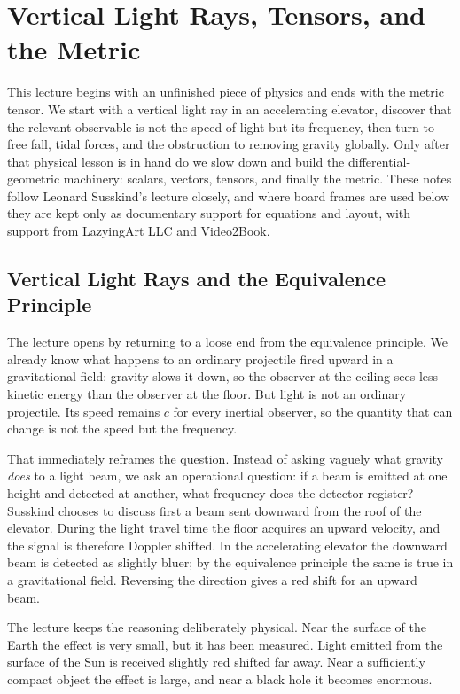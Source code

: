 \chapter{Vertical Light Rays, Tensors, and the Metric}

This lecture begins with an unfinished piece of physics and ends with the metric tensor. We start with a vertical light ray in an accelerating elevator, discover that the relevant observable is not the speed of light but its frequency, then turn to free fall, tidal forces, and the obstruction to removing gravity globally. Only after that physical lesson is in hand do we slow down and build the differential-geometric machinery: scalars, vectors, tensors, and finally the metric. These notes follow Leonard Susskind's lecture closely, and where board frames are used below they are kept only as documentary support for equations and layout, with support from LazyingArt LLC and Video2Book.

\section{Vertical Light Rays and the Equivalence Principle}

The lecture opens by returning to a loose end from the equivalence principle. We already know what happens to an ordinary projectile fired upward in a gravitational field: gravity slows it down, so the observer at the ceiling sees less kinetic energy than the observer at the floor. But light is not an ordinary projectile. Its speed remains \(c\) for every inertial observer, so the quantity that can change is not the speed but the frequency.

That immediately reframes the question. Instead of asking vaguely what gravity \emph{does} to a light beam, we ask an operational question: if a beam is emitted at one height and detected at another, what frequency does the detector register? Susskind chooses to discuss first a beam sent downward from the roof of the elevator. During the light travel time the floor acquires an upward velocity, and the signal is therefore Doppler shifted. In the accelerating elevator the downward beam is detected as slightly bluer; by the equivalence principle the same is true in a gravitational field. Reversing the direction gives a red shift for an upward beam.

The lecture keeps the reasoning deliberately physical. Near the surface of the Earth the effect is very small, but it has been measured. Light emitted from the surface of the Sun is received slightly red shifted far away. Near a sufficiently compact object the effect is large, and near a black hole it becomes enormous.

